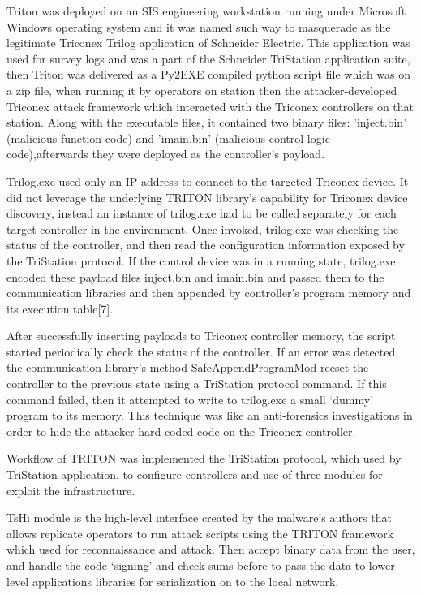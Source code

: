 \documentclass[conference]{IEEEtran}
\begin{document}
Triton was deployed on an SIS engineering workstation running under Microsoft Windows operating system and it was named such way to masquerade as the legitimate Triconex Trilog application of Schneider Electric. This application was used for survey logs and was a part of the Schneider TriStation application suite, then Triton was delivered as a Py2EXE compiled python script file which was on a zip file, when running it by operators on station  then the  attacker-developed Triconex attack framework which interacted with the Triconex controllers on that station. Along with the executable files, it contained two binary files: 'inject.bin' (malicious function code) and 'imain.bin' (malicious control logic code),afterwards  they were deployed as the controller’s payload.

Trilog.exe used only an IP address to connect to the targeted Triconex device. It did not leverage the underlying TRITON library’s capability for Triconex device discovery, instead an instance of trilog.exe had to be called separately for each target controller in the environment. Once invoked, trilog.exe was checking the status of the controller, and then read the configuration information exposed by the TriStation protocol. If the control device was in a running state, trilog.exe encoded these payload files inject.bin and imain.bin and passed them to the communication libraries and then appended by controller’s program memory and its execution table[7].

After successfully inserting payloads to Triconex controller memory, the script started periodically check the status of the controller. If an error was detected, the communication library’s method SafeAppendProgramMod reeset the controller to the previous state using a TriStation protocol command. If this command failed, then it attempted to write to trilog.exe a small ‘dummy’ program to its memory. This technique was like an anti-forensics investigations in order to  hide the attacker hard-coded code on the Triconex controller.

Workflow of TRITON was implemented the TriStation protocol, which used by TriStation application, to configure controllers and use of three modules for exploit the infrastructure.

TsHi module is the high-level interface created by the malware’s authors that allows replicate operators to run attack scripts using the TRITON framework which used for reconnaissance and attack. Then accept binary data from the user, and handle the code ‘signing’ and check sums before to pass the data to lower level applications libraries  for serialization on to the local network.
\end{document}
